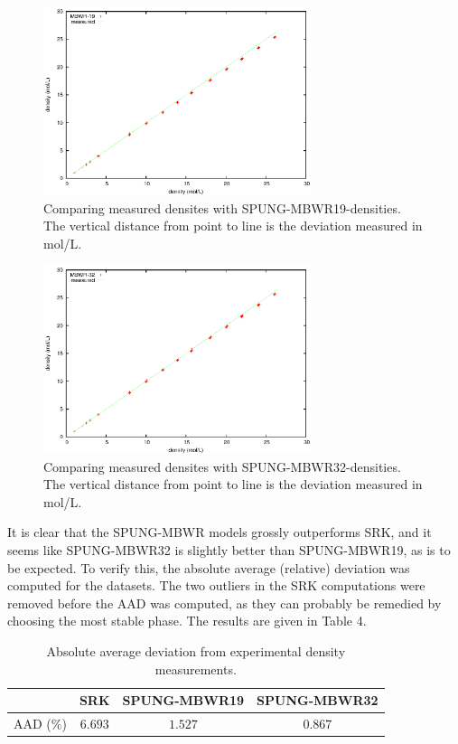 \documentclass[internal,english]{sintefmemo2012}
\numberwithin{equation}{section}
\begin{document}
\begin{figure}[h]
  \centering
  \includegraphics[width=0.7\textwidth]{figures/MBWR19_density.eps}
  \caption{Comparing measured densites with SPUNG-MBWR19-densities. The vertical distance from point to line is the deviation measured in mol/L.}
  \label{19_density}
\end{figure}

\begin{figure}[h]
  \centering
  \includegraphics[width=0.7\textwidth]{figures/MBWR32_density.eps}
  \caption{Comparing measured densites with SPUNG-MBWR32-densities. The vertical distance from point to line is the deviation measured in mol/L.}
  \label{32_density}
\end{figure}

It is clear that the SPUNG-MBWR models grossly outperforms SRK, and it seems like SPUNG-MBWR32 is slightly better than SPUNG-MBWR19, as is to be expected. To verify this, the absolute average (relative) deviation was computed for the datasets. The two outliers in the SRK computations were removed before the AAD was computed, as they can probably be remedied by choosing the most stable phase. The results are given in Table 4.

\begin{table}
  \label{aad}
  \centering
  \begin{tabular}{c | c c c}
    &  SRK     	&SPUNG-MBWR19 	&SPUNG-MBWR32      \\
    \hline
    AAD (\%)	        &  $6.693$     	&$1.527$ 	&$0.867$
  \end{tabular}
  \caption{Absolute average deviation from experimental density measurements.}
\end{table}
\end{document}
